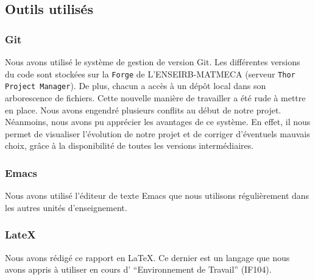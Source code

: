 \documentclass[12pt]{article}
\begin{document}
        \subsection{Outils utilisés}
        \subsubsection{Git}
        Nous avons utilisé le système de gestion de version Git. Les différentes versions du code sont stockées sur la \texttt{Forge} de L'ENSEIRB-MATMECA (serveur \texttt{Thor Project Manager}). De plus, chacun a accès à un dépôt local dans son arborescence de fichiers. Cette nouvelle manière de travailler a été rude à mettre en place. Nous avons engendré plusieurs conflits au début de notre projet. Néanmoins, nous avons pu apprécier les avantages de ce système. En effet, il nous permet de visualiser l'évolution de notre projet et de corriger d'éventuels mauvais choix, grâce à la disponibilité de toutes les versions intermédiaires.\\
        \subsubsection{Emacs}
        Nous avons utilisé l'éditeur de texte Emacs que nous utilisons régulièrement dans les autres unités d'enseignement.\\
        \subsubsection{LateX}
        Nous avons rédigé ce rapport en \LaTeX. Ce dernier est un langage que nous avons appris à utiliser en cours d' ``Environnement de Travail'' (IF104).\\
\end{document}
